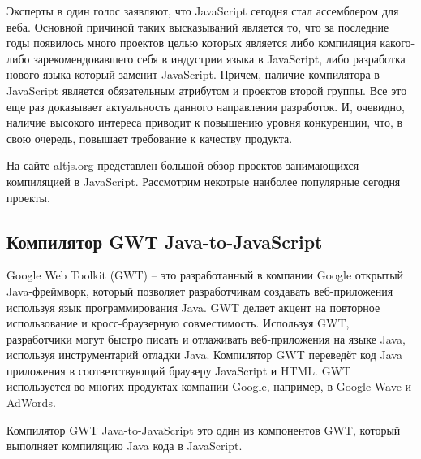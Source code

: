 Эксперты в один голос заявляют, что JavaScript сегодня стал ассемблером для веба.\cite{JsIsAsm1, JsIsAsm2}
Основной причиной таких высказываний является то, что за последние годы появилось много проектов целью которых является либо компиляция какого-либо зарекомендовавшего себя в индустрии языка в JavaScript, либо разработка нового языка который заменит JavaScript. Причем, наличие компилятора в JavaScript является обязательным атрибутом и проектов второй группы.
Все это еще раз доказывает актуальность данного направления разработок. И, очевидно, наличие высокого интереса приводит к повышению уровня конкуренции, что, в свою очередь, повышает требование к качеству продукта.

На сайте \url{altjs.org} представлен большой обзор проектов занимающихся компиляцией в JavaScript. Рассмотрим некотрые наиболее популярные сегодня проекты.
\cite{langpop}

\subsection{Компилятор GWT Java-to-JavaScript}

Google Web Toolkit (GWT) -- это  разработанный в компании Google открытый Java-фреймворк, который позволяет разработчикам создавать веб-приложения используя язык программирования Java. GWT делает акцент на повторное использование и кросс-браузерную совместимость.
Используя GWT, разработчики могут быстро писать и отлаживать веб-приложения на языке Java, используя инструментарий отладки Java. Компилятор GWT переведёт код Java приложения в соответствующий браузеру JavaScript и HTML.
\cite{wiki:GWT:ru}
GWT используется во многих продуктах компании Google, например, в  Google Wave и AdWords.
\cite{GWT:overview}

Компилятор GWT Java-to-JavaScript это один из компонентов GWT, который выполняет компиляцию Java кода в JavaScript.


